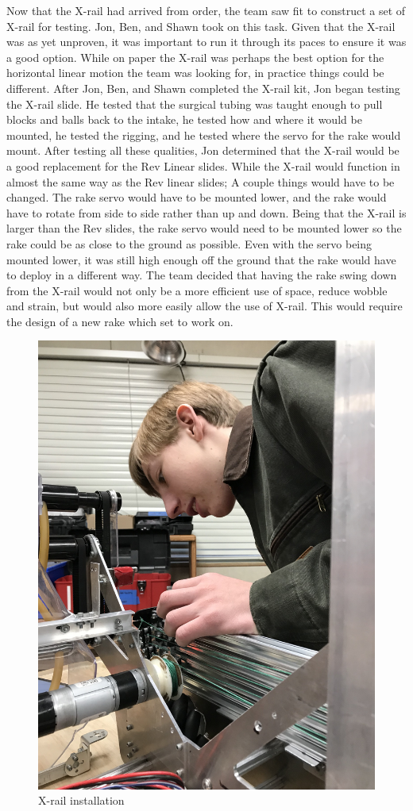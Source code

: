 \documentclass{article}
\begin{document}
Now that the X-rail had arrived from order, the team saw fit to construct a set of X-rail for testing. Jon, Ben, and Shawn took on this task. Given that the X-rail was as yet unproven, it was important to run it through its paces to ensure it was a good option. While on paper the X-rail was perhaps the best option for the horizontal linear motion the team was looking for, in practice things could be different. After Jon, Ben, and Shawn completed the X-rail kit, Jon began testing the X-rail slide. He tested that the surgical tubing was taught enough to pull blocks and balls back to the intake, he tested how and where it would be mounted, he tested the rigging, and he tested where the servo for the rake would mount. After testing all these qualities, Jon determined that the X-rail would be a good replacement for the Rev Linear slides. While the X-rail would function in almost the same way as the Rev linear slides; A couple things would have to be changed. The rake servo would have to be mounted lower, and the rake would have to rotate from side to side rather than up and down. Being that the X-rail is larger than the Rev slides, the rake servo would need to be mounted lower so the rake could be as close to the ground as possible. Even with the servo being mounted lower, it was still high enough off the ground that the rake would have to deploy in a different way. The team decided that having the rake swing down from the X-rail would not only be a more efficient use of space, reduce wobble and strain, but would also more easily allow the use of X-rail. This would require the design of a new rake which set to work on. 

\begin{figure}
    \centering
    \includegraphics[width=.6 \textwidth]{15_12-10/images/IMG_8107[1].jpg}
    \caption{X-rail installation}
    \label{fig:my_label}
\end{figure}
\end{document}
